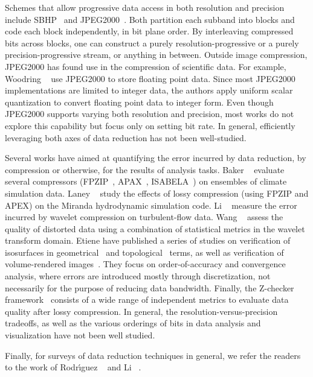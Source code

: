 Schemes that allow progressive data access in both resolution and precision include
SBHP~\cite{sbhp2000} and JPEG2000~\cite{jpeg2000}. Both partition each subband into blocks and code
each block independently, in bit plane order. By interleaving compressed bits across blocks, one can
construct a purely resolution-progressive or a purely precision-progressive stream, or anything in
between. Outside image compression, JPEG2000 has found use in the compression of scientific data.
For example, Woodring \etal~\cite{woodring2011} use JPEG2000 to store floating point data. Since
most JPEG2000 implementations are limited to integer data, the authors apply uniform scalar
quantization to convert floating point data to integer form. Even though JPEG2000 supports varying
both resolution and precision, most works do not explore this capability but focus only on setting
bit rate. In general, efficiently leveraging both axes of data reduction has not been well-studied.

Several works have aimed at quantifying the error incurred by data reduction, by compression or
otherwise, for the results of analysis tasks. Baker \etal~\cite{evaluating-compression-climate}
evaluate several compressors (FPZIP~\cite{fpzip}, APAX~\cite{apax}, ISABELA~\cite{isabela}) on
ensembles of climate simulation data. Laney \etal~\cite{compression_sim2013} study the effects of
lossy compression (using FPZIP and APEX) on the Miranda hydrodynamic simulation code. Li
\etal~\cite{evaluating-efficacy-wavelet} measure the error incurred by wavelet compression on
turbulent-flow data. Wang \etal~\cite{statistical-volume-quality} assess the quality of distorted
data using a combination of statistical metrics in the wavelet transform domain. Etiene \etal have
published a series of studies on verification of isosurfaces in
geometrical~\cite{verifiable-isosurface} and topological~\cite{topology-verification-isosurface}
terms, as well as verification of volume-rendered images~\cite{verifying-volume-rendering}. They
focus on order-of-accuracy and convergence analysis, where errors are introduced mostly through
discretization, not necessarily for the purpose of reducing data bandwidth. Finally, the Z-checker
framework~\cite{z-checker} consists of a wide range of independent metrics to evaluate data quality
after lossy compression. In general, the resolution-versus-precision tradeoffs, as well as the
various orderings of bits in data analysis and visualization have not been well studied.


Finally, for surveys of data reduction techniques in general, we refer the readers to the work of
Rodr\'{\i}guez \etal~\cite{state-of-the-art-compressed-volume} and Li \etal~\cite{li2018}.

